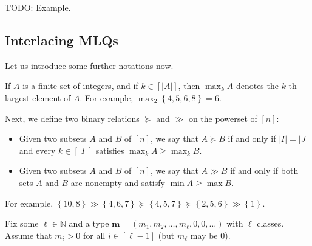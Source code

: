 \documentclass[reqno]{amsart}%
\newcommand{\0}{\phantom{c}}
\newcommand{\defn}[1]{{\color{darkred}\emph{#1}}}
\theoremstyle{plain}
\theoremstyle{definition}
\numberwithin{equation}{section}
\begin{document}
TODO: Example.

\subsection{Interlacing MLQs}

Let us introduce some further notations now.

If $A$ is a finite set of integers, and if $k\in\left[  \left\vert
A\right\vert \right]  $, then \defn{$\max_k A$} denotes the $k$-th largest
element of $A$. For example, $\max\nolimits_{2}\left\{  4,5,6,8\right\}  =6$.

Next, we define two binary relations $\succeq$ and $\gg$ on the powerset of
$\left[  n \right]  $:

\begin{itemize}
\item Given two subsets $A$ and $B$ of $\left[  n \right]  $, we say that
\defn{$A\succeq B$} if and only if $\left\vert I\right\vert =\left\vert
J\right\vert $ and every $k\in\left[  \left\vert I\right\vert \right]  $
satisfies $\max\nolimits_{k}A\geq\max\nolimits_{k}B$.

\item Given two subsets $A$ and $B$ of $\left[  n \right]  $, we say that
\defn{$A \gg B$} if and only if both sets $A$ and $B$ are nonempty and satisfy
$\min A \geq\max B$.
\end{itemize}

For example, $\left\{  10,8\right\}  \gg\left\{  4,6,7\right\}  \succeq
\left\{  4,5,7\right\}  \succeq\left\{  2,5,6\right\}  \gg\left\{  1\right\}
$.

Fix some $\ell\in\mathbb{N}$ and a type $\mathbf{m}=\left(  m_{1},m_{2}%
,\ldots,m_{\ell},0,0,\ldots\right)  $ with $\ell$ classes. Assume that
$m_{i}>0$ for all $i\in\left[  \ell-1\right]  $ (but $m_{\ell}$ may be $0$).
\end{document}
